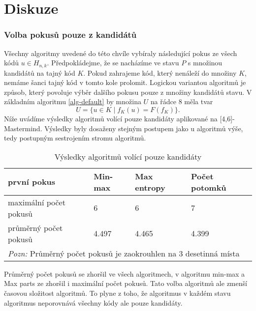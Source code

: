 
\section{Diskuze}
\subsubsection{Volba pokusů pouze z kandidátů}
Všechny algoritmy uvedené do této chvíle vybíraly následující pokus ze všech kódů $u\in H_{n,k}$. Předpokládejme, že se nacházíme ve stavu $P$ s množinou kandidátů na tajný kód $K$. Pokud zahrajeme kód, který nenáleží do množiny $K$, nemáme šanci tajný kód v tomto kole prolomit. Logickou variantou algoritmů je způsob, který povoluje výběr dalšího pokusu pouze z množiny kandidátů stavu. V základním algoritmu \ref{alg-default} by množina $U$ na řádce $8$ měla tvar
\[U = \{u \in K \mid f_K(u) = F(f_K)\}.\]
Níže uvádíme výsledky algoritmů volící pouze kandidáty aplikované na [4,6]-Mastermind. Výsledky byly dosaženy stejným postupem jako u algoritmů výše, tedy postupným sestrojením stromu algoritmů. 

\begin{table}[h]
\centering
\begin{tabular}{l l l l}
\toprule
první pokus & Min-max & Max entropy & Počet potomků  \\
\midrule

maximální počet pokusů 
& 6 & 6 & 7  \\

průměrný počet pokusů 
& 4.497 & 4.465 & 4.399 \\
\bottomrule
\multicolumn{4}{l}{\footnotesize \textit{Pozn:}
Průměrný počet pokusů je zaokrouhlen na $3$ desetinná místa}
\end{tabular}
\caption{Výsledky algoritmů volící pouze kandidáty}\label{tabminmaxvysl}
\end{table}

Průměrný počet pokusů se zhoršil ve všech algoritmech, v algoritmu min-max a Max parts ze zhoršil i maximální počet pokusů. Tato volba algoritmů ale zmenší časovou složitost algoritmů. To plyne z toho, že algoritmus v každém stavu algoritmus neporovnává všechny kódy ale pouze kandidáty. 


